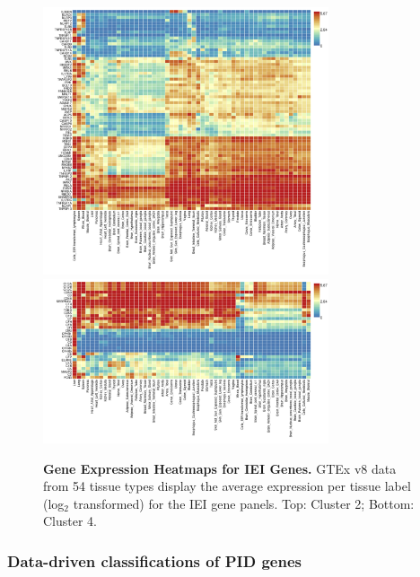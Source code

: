 \begin{figure}[h]
\centering
\includegraphics[width=0.75\textwidth]{../images/expHeat_FUMA_jobs604419_var_risk_est_cluster_2.png}
\includegraphics[width=0.75\textwidth]{../images/expHeat_FUMA_jobs604403_var_risk_est_cluster_4.png}
\caption{\textbf{Gene Expression Heatmaps for IEI Genes.} GTEx v8 data from 54 tissue types display the average expression per tissue label (log\(_2\) transformed) for the IEI gene panels. Top: Cluster 2; Bottom: Cluster 4.}
\label{fig:expHeatmaps}
\end{figure}

\clearpage

\subsubsection{Data-driven classifications of PID genes}

